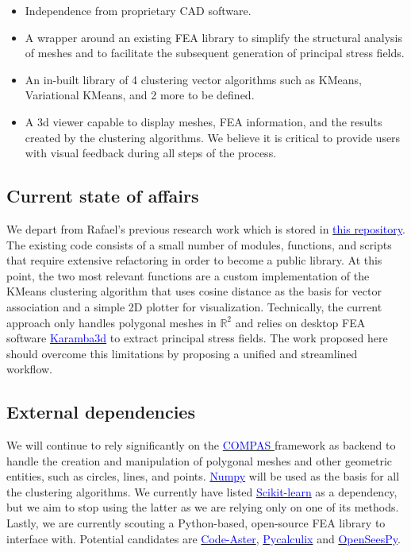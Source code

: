 \documentclass[11pt]{article}
\begin{document}
\begin{itemize}
    \item Independence from proprietary CAD software.
    \item A wrapper around an existing FEA library to simplify the structural analysis of meshes and to facilitate the subsequent generation of principal stress fields.
    \item An in-built library of 4 clustering vector algorithms such as KMeans, Variational KMeans, and 2 more to be defined.
    \item A 3d viewer capable to display meshes, FEA information, and the results created by the clustering algorithms. We believe it is critical to provide users with visual feedback during all steps of the process.
\end{itemize}

\subsection{Current state of affairs}
We depart from Rafael's previous research work which is stored in \href{http://www.github.com/arpastrana/directional_clustering}{\textcolor{blue}{this repository}}. The existing code consists of a small number of modules, functions, and scripts that require extensive refactoring in order to become a public library. At this point, the two most relevant functions are a custom implementation of the KMeans clustering algorithm that uses cosine distance as the basis for vector association and a simple 2D plotter for visualization. Technically, the current approach only handles polygonal meshes in $\mathbb{R}^2$ and relies on desktop FEA software \href{http://www.karamba3d.com/}{\textcolor{blue}{Karamba3d}} to extract principal stress fields. The work proposed here should overcome this limitations by proposing a unified and streamlined workflow.

\subsection{External dependencies}
We will continue to rely significantly on the \href{http://www.compas.dev}{\textcolor{blue}{ COMPAS }} framework as backend to handle the creation and manipulation of polygonal meshes and other geometric entities, such as circles, lines, and points. \href{http://www.numpy.org}{\textcolor{blue}{Numpy}} will be used as the basis for all the clustering algorithms. We currently have listed \href{https://scikit-learn.org/stable/index.html}{\textcolor{blue}{Scikit-learn}} as a dependency, but we aim to stop using the latter as we are relying only on one of its methods. Lastly, we are currently scouting a Python-based, open-source FEA library to interface with. Potential candidates are \href{https://www.code-aster.org/spip.php?rubrique21}{\textcolor{blue}{Code-Aster}}, \href{https://github.com/spacether/pycalculix}{\textcolor{blue}{Pycalculix}} and \href{https://openseespydoc.readthedocs.io/en/latest/}{\textcolor{blue}{OpenSeesPy}}.
\end{document}
